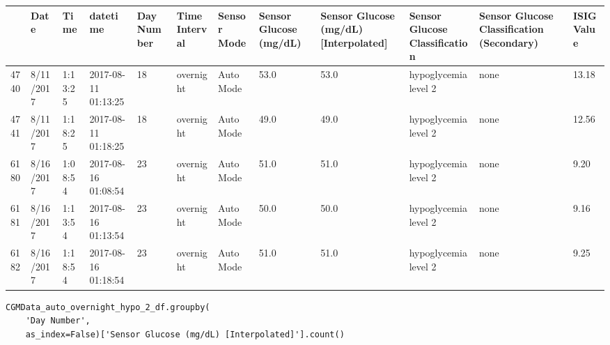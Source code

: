 \bigskip\noindent
\begin{tabular}{p{}p{}p{}p{}p{}p{}p{}p{}p{}p{}p{}p{}}
\toprule
 & Date & Time & datetime & Day Number & Time Interval & Sensor Mode & Sensor Glucose (mg/dL) & Sensor Glucose (mg/dL) [Interpolated] & Sensor Glucose Classification & Sensor Glucose Classification (Secondary) & ISIG Value \\
\hline
4740 & 8/11/2017 & 1:13:25 & 2017-08-11 01:13:25 & 18 & overnight & Auto Mode & 53.0 & 53.0 & hypoglycemia level 2 & none & 13.18 \\
\hline
4741 & 8/11/2017 & 1:18:25 & 2017-08-11 01:18:25 & 18 & overnight & Auto Mode & 49.0 & 49.0 & hypoglycemia level 2 & none & 12.56 \\
\hline
6180 & 8/16/2017 & 1:08:54 & 2017-08-16 01:08:54 & 23 & overnight & Auto Mode & 51.0 & 51.0 & hypoglycemia level 2 & none & 9.20 \\
\hline
6181 & 8/16/2017 & 1:13:54 & 2017-08-16 01:13:54 & 23 & overnight & Auto Mode & 50.0 & 50.0 & hypoglycemia level 2 & none & 9.16 \\
\hline
6182 & 8/16/2017 & 1:18:54 & 2017-08-16 01:18:54 & 23 & overnight & Auto Mode & 51.0 & 51.0 & hypoglycemia level 2 & none & 9.25 \\
\hline
\bottomrule
\end{tabular}

\bigskip

\begin{verbatim}
CGMData_auto_overnight_hypo_2_df.groupby(
    'Day Number', 
    as_index=False)['Sensor Glucose (mg/dL) [Interpolated]'].count()
\end{verbatim}

